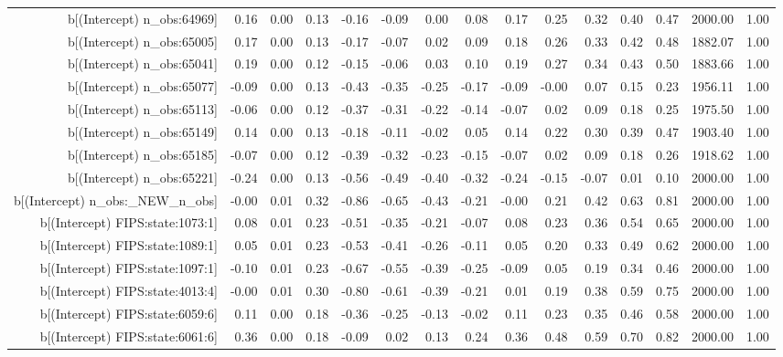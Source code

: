 \begin{table}[ht]
\begin{tabular}{rrrrrrrrrrrrrrr}
  b[(Intercept) n\_obs:64969] & 0.16 & 0.00 & 0.13 & -0.16 & -0.09 & 0.00 & 0.08 & 0.17 & 0.25 & 0.32 & 0.40 & 0.47 & 2000.00 & 1.00 \\ 
  b[(Intercept) n\_obs:65005] & 0.17 & 0.00 & 0.13 & -0.17 & -0.07 & 0.02 & 0.09 & 0.18 & 0.26 & 0.33 & 0.42 & 0.48 & 1882.07 & 1.00 \\ 
  b[(Intercept) n\_obs:65041] & 0.19 & 0.00 & 0.12 & -0.15 & -0.06 & 0.03 & 0.10 & 0.19 & 0.27 & 0.34 & 0.43 & 0.50 & 1883.66 & 1.00 \\ 
  b[(Intercept) n\_obs:65077] & -0.09 & 0.00 & 0.13 & -0.43 & -0.35 & -0.25 & -0.17 & -0.09 & -0.00 & 0.07 & 0.15 & 0.23 & 1956.11 & 1.00 \\ 
  b[(Intercept) n\_obs:65113] & -0.06 & 0.00 & 0.12 & -0.37 & -0.31 & -0.22 & -0.14 & -0.07 & 0.02 & 0.09 & 0.18 & 0.25 & 1975.50 & 1.00 \\ 
  b[(Intercept) n\_obs:65149] & 0.14 & 0.00 & 0.13 & -0.18 & -0.11 & -0.02 & 0.05 & 0.14 & 0.22 & 0.30 & 0.39 & 0.47 & 1903.40 & 1.00 \\ 
  b[(Intercept) n\_obs:65185] & -0.07 & 0.00 & 0.12 & -0.39 & -0.32 & -0.23 & -0.15 & -0.07 & 0.02 & 0.09 & 0.18 & 0.26 & 1918.62 & 1.00 \\ 
  b[(Intercept) n\_obs:65221] & -0.24 & 0.00 & 0.13 & -0.56 & -0.49 & -0.40 & -0.32 & -0.24 & -0.15 & -0.07 & 0.01 & 0.10 & 2000.00 & 1.00 \\ 
  b[(Intercept) n\_obs:\_NEW\_n\_obs] & -0.00 & 0.01 & 0.32 & -0.86 & -0.65 & -0.43 & -0.21 & -0.00 & 0.21 & 0.42 & 0.63 & 0.81 & 2000.00 & 1.00 \\ 
  b[(Intercept) FIPS:state:1073:1] & 0.08 & 0.01 & 0.23 & -0.51 & -0.35 & -0.21 & -0.07 & 0.08 & 0.23 & 0.36 & 0.54 & 0.65 & 2000.00 & 1.00 \\ 
  b[(Intercept) FIPS:state:1089:1] & 0.05 & 0.01 & 0.23 & -0.53 & -0.41 & -0.26 & -0.11 & 0.05 & 0.20 & 0.33 & 0.49 & 0.62 & 2000.00 & 1.00 \\ 
  b[(Intercept) FIPS:state:1097:1] & -0.10 & 0.01 & 0.23 & -0.67 & -0.55 & -0.39 & -0.25 & -0.09 & 0.05 & 0.19 & 0.34 & 0.46 & 2000.00 & 1.00 \\ 
  b[(Intercept) FIPS:state:4013:4] & -0.00 & 0.01 & 0.30 & -0.80 & -0.61 & -0.39 & -0.21 & 0.01 & 0.19 & 0.38 & 0.59 & 0.75 & 2000.00 & 1.00 \\ 
  b[(Intercept) FIPS:state:6059:6] & 0.11 & 0.00 & 0.18 & -0.36 & -0.25 & -0.13 & -0.02 & 0.11 & 0.23 & 0.35 & 0.46 & 0.58 & 2000.00 & 1.00 \\ 
  b[(Intercept) FIPS:state:6061:6] & 0.36 & 0.00 & 0.18 & -0.09 & 0.02 & 0.13 & 0.24 & 0.36 & 0.48 & 0.59 & 0.70 & 0.82 & 2000.00 & 1.00 \\ 

\end{tabular}
\end{table}
